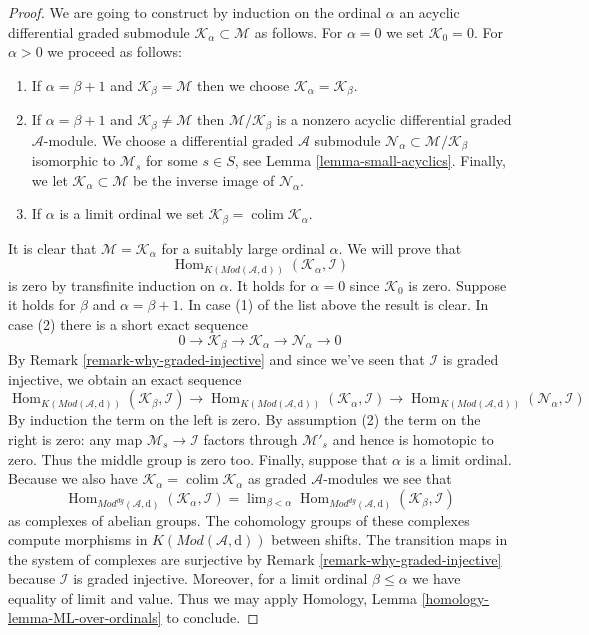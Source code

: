 \documentclass{stacks-project}
\theoremstyle{plain}
\theoremstyle{definition}
\theoremstyle{remark}
\numberwithin{equation}{subsection}
\def\lim{\mathop{\mathrm{lim}}\nolimits}
\def\colim{\mathop{\mathrm{colim}}\nolimits}
\def\Hom{\mathop{\mathrm{Hom}}\nolimits}
\begin{document}
\begin{proof}
\medskip\noindent
We are going to construct by induction on the ordinal $\alpha$
an acyclic differential graded submodule
$\mathcal{K}_\alpha \subset \mathcal{M}$ as follows.
For $\alpha = 0$ we set $\mathcal{K}_0 = 0$. For $\alpha > 0$
we proceed as follows:
\begin{enumerate}
\item If $\alpha = \beta + 1$ and $\mathcal{K}_\beta = \mathcal{M}$
then we choose $\mathcal{K}_\alpha = \mathcal{K}_\beta$.
\item If $\alpha = \beta + 1$ and $\mathcal{K}_\beta \not = \mathcal{M}$
then $\mathcal{M}/\mathcal{K}_\beta$ is a nonzero acyclic
differential graded $\mathcal{A}$-module.
We choose a differential graded $\mathcal{A}$ submodule
$\mathcal{N}_\alpha \subset \mathcal{M}/\mathcal{K}_\beta$
isomorphic to $\mathcal{M}_s$ for some $s \in S$, see
Lemma \ref{lemma-small-acyclics}.
Finally, we let $\mathcal{K}_\alpha \subset \mathcal{M}$
be the inverse image of $\mathcal{N}_\alpha$.
\item If $\alpha$ is a limit ordinal we set
$\mathcal{K}_\beta = \colim \mathcal{K}_\alpha$.
\end{enumerate}
It is clear that $\mathcal{M} = \mathcal{K}_\alpha$ for a suitably large
ordinal $\alpha$. We will prove that
$$
\Hom_{K(\textit{Mod}(\mathcal{A}, \text{d}))}(\mathcal{K}_\alpha, \mathcal{I})
$$
is zero by transfinite induction on $\alpha$. It holds for $\alpha = 0$
since $\mathcal{K}_0$ is zero. Suppose it holds for $\beta$ and
$\alpha = \beta + 1$. In case (1) of the list above the result is clear.
In case (2) there is a short exact sequence
$$
0 \to \mathcal{K}_\beta \to \mathcal{K}_\alpha \to \mathcal{N}_\alpha \to 0
$$
By Remark \ref{remark-why-graded-injective}
and since we've seen that $\mathcal{I}$ is graded
injective, we obtain an exact sequence
$$
\Hom_{K(\textit{Mod}(\mathcal{A}, \text{d}))}(\mathcal{K}_\beta, \mathcal{I})
\to
\Hom_{K(\textit{Mod}(\mathcal{A}, \text{d}))}(\mathcal{K}_\alpha, \mathcal{I})
\to
\Hom_{K(\textit{Mod}(\mathcal{A}, \text{d}))}(\mathcal{N}_\alpha, \mathcal{I})
$$
By induction the term on the left is zero. By assumption (2)
the term on the right is zero: any map $\mathcal{M}_s \to \mathcal{I}$
factors through $\mathcal{M}'_s$ and hence is homotopic to zero.
Thus the middle group is zero too. Finally, suppose that $\alpha$ is a
limit ordinal. Because we also have
$\mathcal{K}_\alpha = \colim \mathcal{K}_\alpha$ as graded
$\mathcal{A}$-modules we see that
$$
\Hom_{\textit{Mod}^{dg}(\mathcal{A}, \text{d})}
(\mathcal{K}_\alpha, \mathcal{I})
= \lim_{\beta < \alpha}
\Hom_{\textit{Mod}^{dg}(\mathcal{A}, \text{d})}
(\mathcal{K}_\beta, \mathcal{I})
$$
as complexes of abelian groups. The cohomology groups of these
complexes compute morphisms in $K(\textit{Mod}(\mathcal{A}, \text{d}))$
between shifts. The transition maps in the system of complexes
are surjective by Remark \ref{remark-why-graded-injective}
because $\mathcal{I}$ is graded injective.
Moreover, for a limit ordinal $\beta \leq \alpha$
we have equality of limit and value. Thus we may apply
Homology, Lemma \ref{homology-lemma-ML-over-ordinals}
to conclude.
\end{proof}
\end{document}
